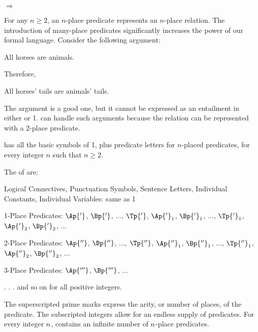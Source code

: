 \begin{menumerate}
	\item {} $\Rightarrow$ 
\end{menumerate}

For any $n\geq2$, an $n$-place predicate represents an $n$-place relation. 
The introduction of many-place predicates significantly increases the power of our formal language. 
Consider the following argument:

\begin{menumerate}
\item All horses are animals.

Therefore,

\item All horses' tails are animals' tails.
\end{menumerate}

\noindent{}The argument is a good one, but it cannot be expressed as an entailment in either \GSL{} or \GQL{}1. 
\GQL{} can handle such arguments because the  relation can be represented with a 2-place predicate. 

\GQL{} has all the basic symbols of \GQL{}1, plus predicate letters for $n$-placed predicates, for every integer $n$ such that $n\geq2$. 
\begin{majorILnc}{}
The  of \GQL{} are:
\begin{cenumerate}
\item Logical Connectives, Punctuation Symbols, Sentence Letters, Individual Constants, Individual Variables: same as \GQL{}1
\item 1-Place Predicates: $\Ap{'}$, $\Bp{'}$, $\ldots$, $\Tp{'}$, $\Ap{'}_1$, $\Bp{'}_1$, $\ldots$, $\Tp{'}_1$, $\Ap{'}_2$, $\Bp{'}_2$, $\ldots$
\item 2-Place Predicates: $\Ap{''}$, $\Bp{''}$, $\ldots$, $\Tp{''}$, $\Ap{''}_1$, $\Bp{''}_1$, $\ldots$, $\Tp{''}_1$, $\Ap{''}_2$, $\Bp{''}_2$, $\ldots$
\item 3-Place Predicates: $\Ap{'''}$, $\Bp{'''}$, $\ldots$
\item[] \hspace{.5in} . . . and so on for all positive integers.
\end{cenumerate}
\end{majorILnc}

\noindent{}The superscripted prime marks express the arity, or number of places, of the predicate.
The subscripted integers allow for an endless supply of predicates.
For every integer $n$, \GQL{} contains an infinite number of $n$-place predicates. 

